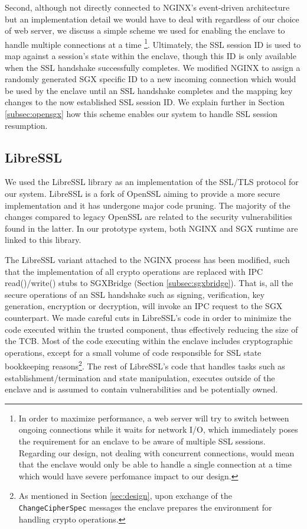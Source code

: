 \documentclass[../main.tex]{subfiles}
\begin{document}
Second, although not directly connected to NGINX's event-driven architecture
but an implementation detail we would have to deal with regardless of our
choice of web server, we discuss a simple scheme we used for enabling the
enclave to handle multiple connections at a time \footnote{In order to maximize
performance, a web server will try to switch between ongoing connections while
it waits for network I/O, which immediately poses the requirement for an
enclave to be aware of multiple SSL sessions. Regarding our design, not dealing
with concurrent connections, would mean that the enclave would only be able to
handle a single connection at a time which would have severe perfomance impact
to our design.}. Ultimately, the SSL session ID is used to map against a
session's state within the enclave, though this ID is only available when the
SSL handshake successfully completes. We modified NGINX to assign a randomly
generated SGX specific ID to a new incoming connection which would be used by
the enclave until an SSL handshake completes and the mapping key changes to the
now established SSL session ID. We explain further in Section
\ref{subsec:opensgx} how this scheme enables our system to handle SSL session
resumption.

\subsection{LibreSSL}
\label{subsec:libressl}
We used the LibreSSL library as an implementation of the SSL/TLS protocol for
our system. LibreSSL is a fork of OpenSSL aiming to provide a more secure
implementation and it has undergone major code pruning. The majority of the
changes compared to legacy OpenSSL are related to the security vulnerabilities
found in the latter. In our prototype system, both NGINX and SGX runtime are
linked to this library.

The LibreSSL variant attached to the NGINX process has been modified, such that
 the implementation of all crypto operations are replaced with IPC
read()/write() stubs to SGXBridge (Section \ref{subsec:sgxbridge}). That is,
all the secure operations of an SSL handshake such as signing, verification,
key generation, encryption or decryption, will invoke an IPC request to the SGX
counterpart. We made careful cuts in LibreSSL's code in order to minimize the
code executed within the trusted component, thus effectively reducing the size
of the TCB. Most of the code executing within the enclave includes
cryptographic operations, except for a small volume of code responsible for
SSL state bookkeeping reasons\footnote{As mentioned in Section
\ref{sec:design}, upon exchange of the \texttt{ChangeCipherSpec} messages the
enclave prepares the environment for handling crypto operations.}. The rest of
LibreSSL's code that handles tasks such as establishment/termination
and state manipulation, executes outside of the enclave and is assumed to
contain vulnerabilities and be potentially owned.
\end{document}
